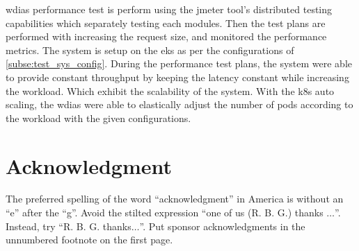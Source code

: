 \documentclass[conference]{IEEEtran}
\begin{document}
\acrshort{wdias} performance test is perform using the \acrshort{jmeter} tool's distributed testing capabilities which separately testing each modules. Then the test plans are performed with increasing the request size, and monitored the performance metrics. The system is setup on the \acrfull{eks} as per the configurations of \ref{subse:test_sys_config}.
During the performance test plans, the system were able to provide constant throughput by keeping the latency constant while increasing the workload. Which exhibit the scalability of the system.
With the \acrshort{k8s} auto scaling, the \acrshort{wdias} were able to elastically adjust the number of pods according to the workload with the given configurations.

\section*{Acknowledgment}

The preferred spelling of the word ``acknowledgment'' in America is without 
an ``e'' after the ``g''. Avoid the stilted expression ``one of us (R. B. 
G.) thanks $\ldots$''. Instead, try ``R. B. G. thanks$\ldots$''. Put sponsor 
acknowledgments in the unnumbered footnote on the first page.


\graphicspath{ {./images/} }



\end{document}

